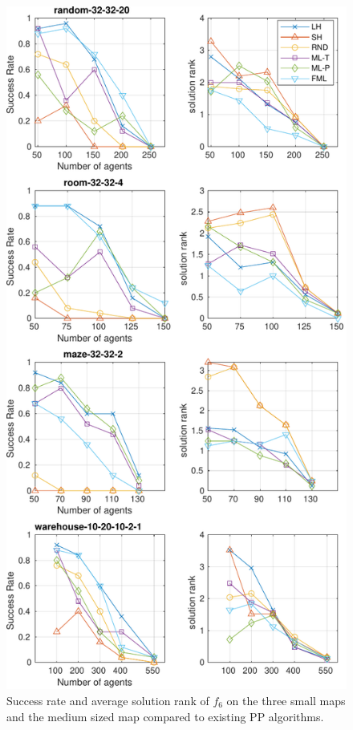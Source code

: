 \begin{figure}[t!]
\centering
\includegraphics[width=1.0\columnwidth]{figs/succRankPortability.pdf}
\caption{Success rate and average solution rank of $ f_{6} $ on the three small maps and the medium sized map compared to existing PP algorithms.}
\label{fig:portability}
\end{figure}

